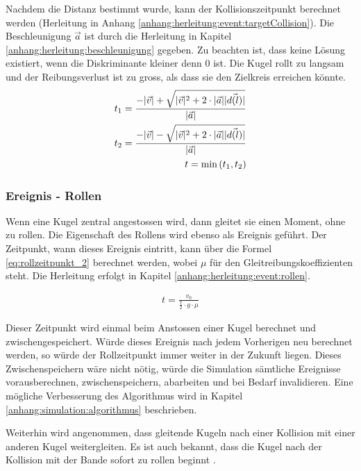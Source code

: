 Nachdem die Distanz bestimmt wurde, kann der Kollisionszeitpunkt berechnet werden (Herleitung in Anhang \ref{anhang:herleitung:event:targetCollision}).
Die Beschleunigung $\vec{a}$ ist durch die Herleitung in Kapitel \ref{anhang:herleitung:beschleunigung} gegeben.
Zu beachten ist, dass keine Lösung existiert, wenn die Diskriminante kleiner denn $0$ ist. Die Kugel rollt zu langsam und
der Reibungsverlust ist zu gross, als dass sie den Zielkreis erreichen könnte.
\begin{align}
    t_1 = \frac{-\lvert \vec{v} \rvert + \sqrt{\lvert \vec{v} \rvert^2 + 2 \cdot \lvert \vec{a} \rvert \lvert \vec{d(l)} \rvert}}{\lvert \vec{a} \rvert}\\
    t_2 = \frac{-\lvert \vec{v} \rvert - \sqrt{\lvert \vec{v} \rvert^2 + 2 \cdot \lvert \vec{a} \rvert \lvert \vec{d(l)} \rvert}}{\lvert \vec{a} \rvert}\\
    t = \min{(t_1, t_2)}
\end{align}

\subsubsection{Ereignis - Rollen}
Wenn eine Kugel zentral angestossen wird, dann gleitet sie einen Moment, ohne zu rollen. Die Eigenschaft des
Rollens wird ebenso als Ereignis geführt.
Der Zeitpunkt, wann dieses Ereignis eintritt, kann über die Formel \ref{eq:rollzeitpunkt_2} berechnet werden,
wobei $\mu$ für den Gleitreibungskoeffizienten steht.
Die Herleitung erfolgt in Kapitel \ref{anhang:herleitung:event:rollen}.

\begin{align}
    t = \frac{v_0}{\frac{7}{2} \cdot g \cdot \mu}\label{eq:rollzeitpunkt_2}
\end{align}

Dieser Zeitpunkt wird einmal beim Anstossen einer Kugel berechnet und zwischengespeichert.
Würde dieses Ereignis nach jedem Vorherigen neu berechnet werden, so würde der Rollzeitpunkt immer weiter in der Zukunft liegen.
Dieses Zwischenspeichern wäre nicht nötig, würde die Simulation sämtliche Ereignisse vorausberechnen, zwischenspeichern,
abarbeiten und bei Bedarf invalidieren. Eine mögliche Verbesserung des Algorithmus wird in Kapitel \ref{anhang:simulation:algorithmus} beschrieben.

Weiterhin wird angenommen, dass gleitende Kugeln nach einer Kollision mit einer anderen Kugel weitergleiten. Es ist
auch bekannt, dass die Kugel nach der Kollision mit der Bande sofort zu rollen beginnt \cite{sciphysik:kugelohneschlupf}.

